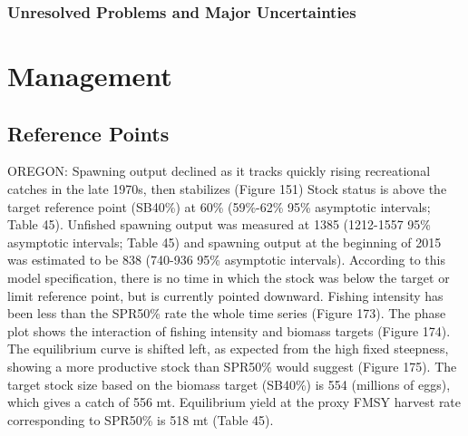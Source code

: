 \documentclass[11pt,
  english,
  letterpaper,
]{article}
\begin{document}
\hypertarget{unresolved-problems-and-major-uncertainties-1}{%
\subsubsection{Unresolved Problems and Major Uncertainties}\label{unresolved-problems-and-major-uncertainties-1}}

\hypertarget{management}{%
\section{Management}\label{management}}

\hypertarget{reference-points-1}{%
\subsection{Reference Points}\label{reference-points-1}}

OREGON: Spawning output declined as it tracks quickly rising recreational catches in the late 1970s, then stabilizes (Figure 151) Stock status is above the target reference point (SB40\%) at 60\% (59\%-62\% 95\% asymptotic intervals; Table 45). Unfished spawning output was measured at 1385 (1212-1557 95\% asymptotic intervals; Table 45) and spawning output at the beginning of 2015 was estimated to be 838 (740-936 95\% asymptotic intervals). According to this model specification, there is no time in which the stock was below the target or limit reference point, but is currently pointed downward. Fishing intensity has been less than the SPR50\% rate the whole time series (Figure 173). The phase plot shows the interaction of fishing intensity and biomass targets (Figure 174). The equilibrium curve is shifted left, as expected from the high fixed steepness, showing a more productive stock than SPR50\% would suggest (Figure 175). The target stock size based on the biomass target (SB40\%) is 554 (millions of eggs), which gives a catch of 556 mt. Equilibrium yield at the proxy FMSY harvest rate corresponding to SPR50\% is 518 mt (Table 45).
\end{document}
